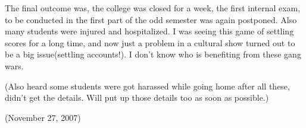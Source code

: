 The final outcome was, the college was closed for a week, the first internal exam, to be conducted in the first part of the odd semester was again postponed. Also many students were injured and hospitalized. I was seeing this game of settling scores for a long time, and now just a problem in a cultural show turned out to be a big issue(settling accounts!). I don’t know who is benefiting from these gang wars.

(Also heard some students were got harassed while going home after all these, didn’t get the details. Will put up those details too as soon as possible.)

(November 27, 2007)
\newpage

